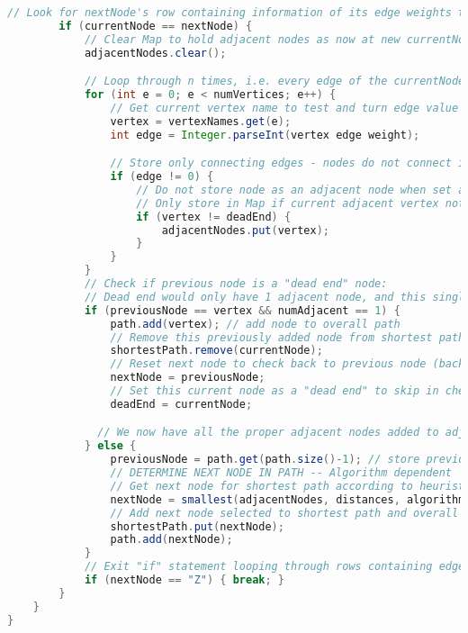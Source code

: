 \begin{lstlisting}[language=Java]
        // Look for nextNode's row containing information of its edge weights to all other nodes
        if (currentNode == nextNode) {
            // Clear Map to hold adjacent nodes as now at new currentNode
            adjacentNodes.clear();

            // Loop through n times, i.e. every edge of the currentNode to store as an adjacent node
            for (int e = 0; e < numVertices; e++) {
                // Get current vertex name to test and turn edge value to Integer from String
                vertex = vertexNames.get(e);
                int edge = Integer.parseInt(vertex edge weight);

                // Store only connecting edges - nodes do not connect if edge == 0
                if (edge != 0) {
                    // Do not store node as an adjacent node when set as a "dead end" node
                    // Only store in Map if current adjacent vertex not a "dead end"
                    if (vertex != deadEnd) {
                        adjacentNodes.put(vertex);
                    }
                }
            }
            // Check if previous node is a "dead end" node:
            // Dead end would only have 1 adjacent node, and this single node is the previous node in path
            if (previousNode == vertex && numAdjacent == 1) {
                path.add(vertex); // add node to overall path
                // Remove this previously added node from shortest path (no longer valid)
                shortestPath.remove(currentNode);
                // Reset next node to check back to previous node (backtrack)
                nextNode = previousNode;
                // Set this current node as a "dead end" to skip in check of nextNode's adjacent nodes
                deadEnd = currentNode;

              // We now have all the proper adjacent nodes added to adjacentNodes Map for the current node. Test all adjacent nodes and get the next node to traverse for the shortest path according to heurist algorithm
            } else {
                previousNode = path.get(path.size()-1); // store previous node's vertex name
                // DETERMINE NEXT NODE IN PATH -- Algorithm dependent
                // Get next node for shortest path according to heurist algorithm called
                nextNode = smallest(adjacentNodes, distances, algorithm);
                // Add next node selected to shortest path and overall path
                shortestPath.put(nextNode);
                path.add(nextNode);
            }
            // Exit "if" statement looping through rows containing edge weights of current node once at node "Z"
            if (nextNode == "Z") { break; }
        }
    }
}


\end{lstlisting}
